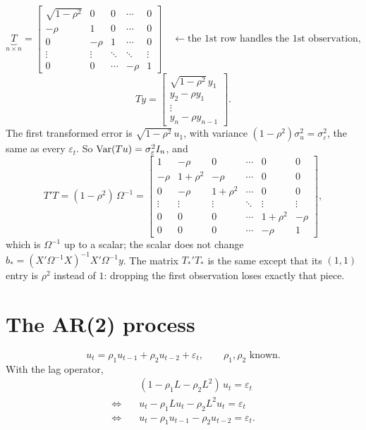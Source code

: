 \documentclass[11pt]{article}
\begin{document}
\[ \underbrace{T}_{n\times n} = \begin{bmatrix}
     \sqrt{1 - \rho^{2}} & 0      & 0      & \cdots & 0\\
     -\rho               & 1      & 0      & \cdots & 0\\
     0                   & -\rho  & 1      & \cdots & 0\\
     \vdots              & \vdots & \ddots & \ddots & \vdots\\
     0                   & 0      & \cdots & -\rho  & 1
   \end{bmatrix}
   \quad \longleftarrow \text{the 1st row handles the 1st observation,} \]
\[ Ty = \begin{bmatrix} \sqrt{1 - \rho^{2}}\,y_{1}\\ y_{2} - \rho y_{1}\\ \vdots\\ y_{n} - \rho y_{n-1} \end{bmatrix}. \]
The first transformed error is $\sqrt{1 - \rho^{2}}\,u_{1}$, with variance
$(1 - \rho^{2})\sigma_{u}^{2} = \sigma_{\varepsilon}^{2}$, the same as every
$\varepsilon_{t}$. So $\operatorname{Var}(Tu) = \sigma_{\varepsilon}^{2}I_{n}$, and
\[ T'T = (1 - \rho^{2})\,\Omega^{-1} = \begin{bmatrix}
     1      & -\rho      & 0          & \cdots & 0      & 0\\
     -\rho  & 1+\rho^{2} & -\rho      & \cdots & 0      & 0\\
     0      & -\rho      & 1+\rho^{2} & \cdots & 0      & 0\\
     \vdots & \vdots     & \vdots     & \ddots & \vdots & \vdots\\
     0      & 0          & 0          & \cdots & 1+\rho^{2} & -\rho\\
     0      & 0          & 0          & \cdots & -\rho  & 1
   \end{bmatrix}, \]
which is $\Omega^{-1}$ up to a scalar; the scalar does not change
$b_{*} = (X'\Omega^{-1}X)^{-1}X'\Omega^{-1}y$. The matrix $T_{*}'T_{*}$ is the same
except that its $(1,1)$ entry is $\rho^{2}$ instead of $1$: dropping the first
observation loses exactly that piece.


\section{The AR(2) process}

\[ u_{t} = \rho_{1}u_{t-1} + \rho_{2}u_{t-2} + \varepsilon_{t}, \qquad
   \rho_{1}, \rho_{2} \text{ known}. \]
With the lag operator,
\begin{align*}
  & (1 - \rho_{1}L - \rho_{2}L^{2})\,u_{t} = \varepsilon_{t}\\
  \Longleftrightarrow\quad & u_{t} - \rho_{1}Lu_{t} - \rho_{2}L^{2}u_{t} = \varepsilon_{t}\\
  \Longleftrightarrow\quad & u_{t} - \rho_{1}u_{t-1} - \rho_{2}u_{t-2} = \varepsilon_{t}.
\end{align*}
\end{document}
